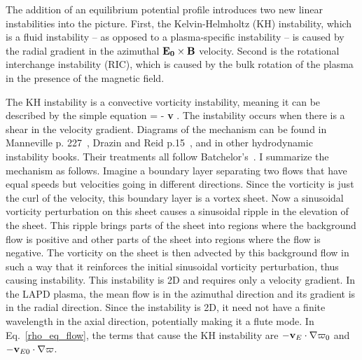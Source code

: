 The addition of an equilibrium potential profile introduces two new linear instabilities into the picture. First, the Kelvin-Helmholtz (KH) instability, which is a fluid instability -- as opposed to
a plasma-specific instability -- is caused by the radial gradient in the azimuthal ${\bf E_0 \times B}$ velocity. Second is the rotational interchange instability (RIC), which is caused by the bulk
rotation of the plasma in the presence of the magnetic field.

The KH instability is a convective vorticity instability, meaning it can be described by the simple equation
\beq
\label{kh_inst_eq}
 = - {\bf v} \cdot \grad \varpi.
\eeq
The instability occurs when there is a shear in the velocity gradient. Diagrams of the mechanism can be found in Manneville p. 227~\cite{manneville2004}, Drazin and Reid p.15~\cite{drazin1981},
and in other hydrodynamic instability books. Their treatments all follow Batchelor's~\cite{batchelor1967}. I summarize the mechanism as follows.
Imagine a boundary layer separating two flows that have equal speeds but velocities going in different directions. Since
the vorticity is just the curl of the velocity, this boundary layer is a vortex sheet. Now a sinusoidal vorticity perturbation on this sheet causes a sinusoidal ripple in the elevation
of the sheet. This ripple brings parts of the sheet into regions where the background flow is positive and other parts of the sheet into regions where the flow is negative. The vorticity on
the sheet is then advected by this background flow in such a way that it reinforces the initial sinusoidal vorticity perturbation, thus causing instability. This instability is 2D and requires
only a velocity gradient.
In the LAPD plasma, the mean flow is in the azimuthal direction and its gradient is in the radial direction. Since the instability is 2D, it need not have a finite wavelength in the axial direction,
potentially making it a flute mode. In Eq.~\ref{rho_eq_flow}, the terms that cause the KH instability are 
$- {\mathbf v_E} \cdot \nabla \varpi_0$ and $- {\mathbf v_{E0}} \cdot \nabla \varpi$.

